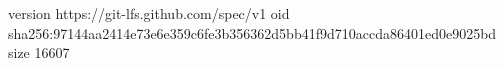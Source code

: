 version https://git-lfs.github.com/spec/v1
oid sha256:97144aa2414e73e6e359c6fe3b356362d5bb41f9d710accda86401ed0e9025bd
size 16607
